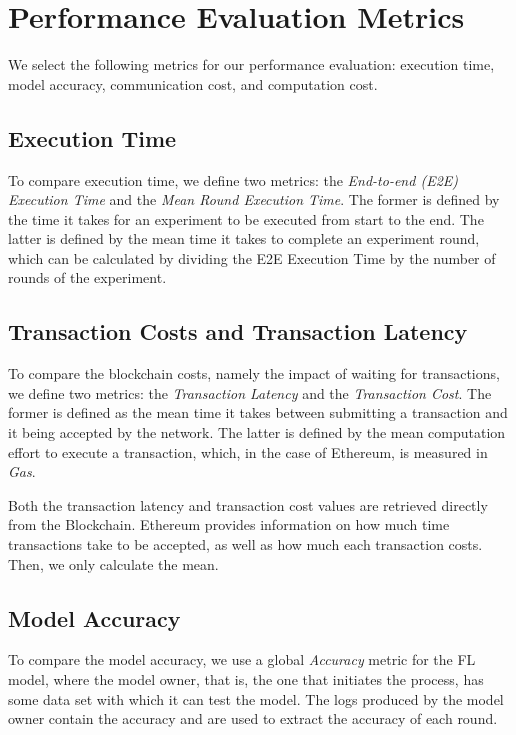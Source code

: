 \section{Performance Evaluation Metrics}\label{eval:metrics}

We select the following metrics for our performance evaluation: execution time, model accuracy, communication cost, and computation cost.

\subsection{Execution Time}

To compare execution time, we define two metrics: the \textit{End-to-end (E2E) Execution Time} and the \textit{Mean Round Execution Time}. The former is defined by the time it takes for an experiment to be executed from start to the end. The latter is defined by the mean time it takes to complete an experiment round, which can be calculated by dividing the E2E Execution Time by the number of rounds of the experiment.

\subsection{Transaction Costs and Transaction Latency}

To compare the blockchain costs, namely the impact of waiting for transactions, we define two metrics: the \textit{Transaction Latency} and the \textit{Transaction Cost}. The former is defined as the mean time it takes between submitting a transaction and it being accepted by the network. The latter is defined by the mean computation effort to execute a transaction, which, in the case of Ethereum, is measured in \textit{Gas}.

Both the transaction latency and transaction cost values are retrieved directly from the Blockchain. Ethereum provides information on how much time transactions take to be accepted, as well as how much each transaction costs. Then, we only calculate the mean.

\subsection{Model Accuracy}

To compare the model accuracy, we use a global \textit{Accuracy} metric for the FL model, where the model owner, that is, the one that initiates the process, has some data set with which it can test the model. The logs produced by the model owner contain the accuracy and are used to extract the accuracy of each round.

